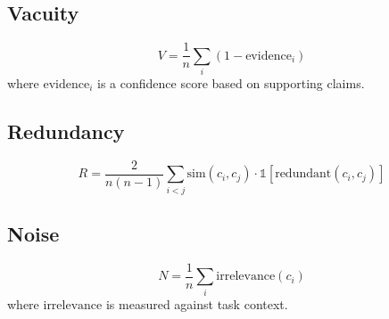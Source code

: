 \documentclass[12pt,a4paper]{article}
\begin{document}
\subsection{Vacuity}
\begin{equation}
V = \frac{1}{n} \sum_i (1 - \text{evidence}_i)
\end{equation}
where $\text{evidence}_i$ is a confidence score based on supporting claims.

\subsection{Redundancy}
\begin{equation}
R = \frac{2}{n(n-1)} \sum_{i < j} \text{sim}(c_i, c_j) \cdot \mathbb{1}[\text{redundant}(c_i, c_j)]
\end{equation}

\subsection{Noise}
\begin{equation}
N = \frac{1}{n} \sum_i \text{irrelevance}(c_i)
\end{equation}
where $\text{irrelevance}$ is measured against task context.
\end{document}
